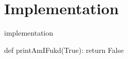 \chapter{Implementation}

implementation

\begin{python}
    def printAmIFukd(True):
        return False
\end{python}
